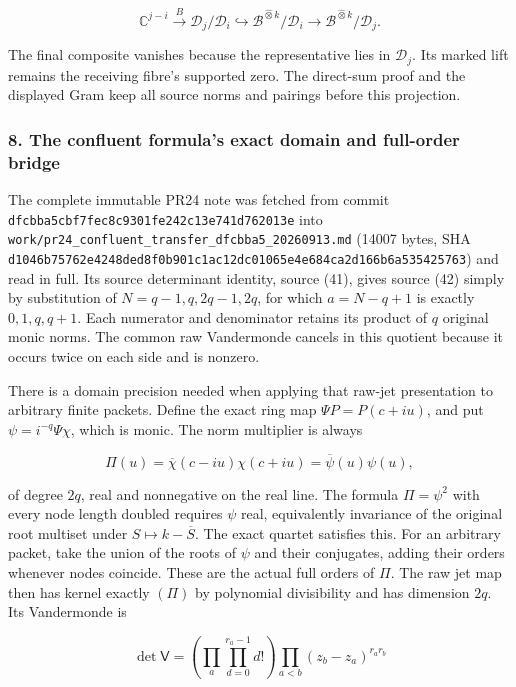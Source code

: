 \[
\mathbb C^{j-i}\xrightarrow{B}\mathcal D_j/\mathcal D_i
\hookrightarrow\mathscr B^{\widehat\otimes k}/\mathcal D_i
\longrightarrow\mathscr B^{\widehat\otimes k}/\mathcal D_j.
\]

The final composite vanishes because the representative lies in \(\mathcal D_j\). Its marked lift remains the receiving fibre's supported zero. The direct-sum proof and the displayed Gram keep all source norms and pairings before this projection.

\subsubsection{8. The confluent formula's exact domain and full-order bridge}\label{endpoint-arithmetic_intake--the-confluent-formulas-exact-domain-and-full-order-bridge}

The complete immutable PR24 note was fetched from commit \nolinkurl{dfcbba5cbf7fec8c9301fe242c13e741d762013e} into \nolinkurl{work/pr24_confluent_transfer_dfcbba5_20260913.md} (14007 bytes, SHA \nolinkurl{d1046b75762e4248ded8f0b901c1ac12dc01065e4e684ca2d166b6a535425763}) and read in full. Its source determinant identity, source (41), gives source (42) simply by substitution of \(N=q-1,q,2q-1,2q\), for which \(a=N-q+1\) is exactly \(0,1,q,q+1\). Each numerator and denominator retains its product of \(q\) original monic norms. The common raw Vandermonde cancels in this quotient because it occurs twice on each side and is nonzero.

There is a domain precision needed when applying that raw-jet presentation to arbitrary finite packets. Define the exact ring map \(\Psi P=P(c+iu)\), and put \(\psi=i^{-q}\Psi\chi\), which is monic. The norm multiplier is always

\[
\Pi(u)=\overline\chi(c-iu)\chi(c+iu)=\overline\psi(u)\psi(u),
\]

of degree \(2q\), real and nonnegative on the real line. The formula \(\Pi=\psi^2\) with every node length doubled requires \(\psi\) real, equivalently invariance of the original root multiset under \(S\mapsto k-\overline S\). The exact quartet satisfies this. For an arbitrary packet, take the union of the roots of \(\psi\) and their conjugates, adding their orders whenever nodes coincide. These are the actual full orders of \(\Pi\). The raw jet map then has kernel exactly \((\Pi)\) by polynomial divisibility and has dimension \(2q\). Its Vandermonde is

\[
\det\mathsf V=
\left(\prod_a\prod_{d=0}^{r_a-1}d!\right)
\prod_{a<b}(z_b-z_a)^{r_ar_b}
\]

